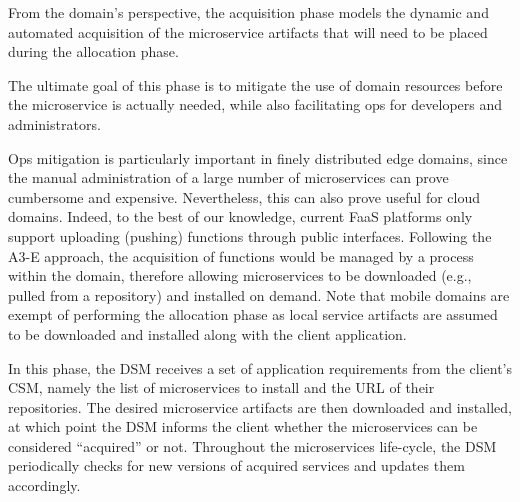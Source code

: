 
From the domain's perspective, the acquisition phase models the dynamic and automated acquisition of the microservice artifacts that will need to be placed during the allocation phase. %



The ultimate goal of this phase is to mitigate the use of domain resources before the microservice is actually needed, while also facilitating ops for developers and administrators. 

Ops mitigation is particularly important in finely distributed edge domains, since the manual administration of a large number of microservices can prove cumbersome and expensive. Nevertheless, this can also prove useful for cloud domains. Indeed, to the best of our knowledge, current FaaS platforms only support uploading (pushing) functions through public interfaces. Following the A3-E approach, the acquisition of functions would be managed by a process within the domain, therefore allowing microservices to be downloaded (e.g., pulled from a repository) and installed on demand. Note that mobile domains are exempt of performing the allocation phase as local service artifacts are assumed to be downloaded and installed along with the client application.


In this phase, the DSM receives a set of application requirements from the client's CSM, namely the list of microservices to install and the URL of their repositories. The desired microservice artifacts are then downloaded and installed, at which point the DSM informs the client whether the microservices can be considered ``acquired'' or not. 
Throughout the microservices life-cycle, the DSM periodically checks for new versions of acquired services and updates them accordingly. 


